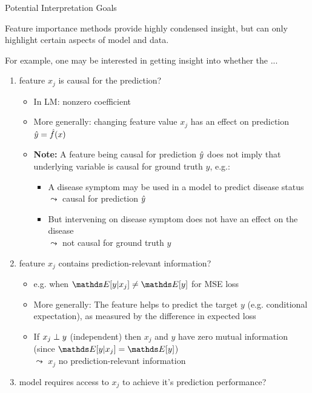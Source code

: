 \begin{vbframe}{Potential Interpretation Goals}

Feature importance methods provide highly condensed insight, but can only highlight certain aspects of model and data.

For example, one may be interested in getting insight into whether the ...

\begin{enumerate}
    \item<1|only@1> feature $x_j$ is causal for the prediction?
    \begin{itemize}
      \item In LM: nonzero coefficient
      \item More generally: changing feature value $x_j$ has an effect on prediction $\yh = \fh(x)$
      \item \textbf{Note:} 
      A feature being causal for prediction $\yh$ does not imply that underlying variable is causal for ground truth $y$, e.g.:
      \begin{itemize}
          \item A disease symptom may be used in a model to predict disease status \\
          $\leadsto$ causal for prediction $\yh$
          \item But intervening on disease symptom does not have an effect on the disease \\
          $\leadsto$ not causal for ground truth $y$
      \end{itemize}
    \end{itemize}
    \item<2|only@2> feature $x_j$ contains prediction-relevant information?
    \begin{itemize}
      \item e.g. when $\E[y|x_j] \neq \E[y]$ for MSE loss
      \item More generally: The feature helps to predict the target $y$ (e.g. conditional expectation), as measured by the difference in expected loss
      \item If $x_j \indep y$ (independent) then $x_j$ and $y$ have zero mutual information (since $\E[y|x_j] = \E[y]$)\\ %
      $\leadsto$ $x_j$ no prediction-relevant information
    \end{itemize}
    \item<3|only@3> model requires access to $x_j$ to achieve it's prediction performance?

\end{enumerate}
\end{vbframe}

